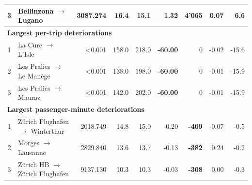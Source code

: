 \documentclass[preprint,12pt]{elsarticle}
\begin{document}
\begin{table}[htbp]
{\begin{tabular}{clrrrrrrr}
3 & Bellinzona $\rightarrow$ Lugano & 3087.274 & 16.4 & 15.1 & 1.32 & \textbf{4'065} & 0.07 & 6.6 \\
\midrule
\multicolumn{9}{l}{\textbf{Largest per-trip deteriorations}} \\
\midrule
1 & La Cure $\rightarrow$ L'Isle & <0.001 & 158.0 & 218.0 & \textbf{-60.00} & 0 & -0.02 & -15.6 \\
2 & Les Pralies $\rightarrow$ Le Manège & <0.001 & 138.0 & 198.0 & \textbf{-60.00} & 0 & -0.01 & -15.9 \\
3 & Les Pralies $\rightarrow$ Mauraz & <0.001 & 142.0 & 202.0 & \textbf{-60.00} & 0 & -0.01 & -15.9 \\
\midrule
\multicolumn{9}{l}{\textbf{Largest passenger-minute deteriorations}} \\
\midrule
1 & Zürich Flughafen $\rightarrow$ Winterthur & 2018.749 & 14.8 & 15.0 & -0.20 & \textbf{-409} & -0.07 & -0.5 \\
2 & Morges $\rightarrow$ Lausanne & 2829.840 & 13.6 & 13.7 & -0.13 & \textbf{-382} & 0.24 & -0.2 \\
3 & Zürich HB $\rightarrow$ Zürich Flughafen & 9137.130 & 10.3 & 10.3 & -0.03 & \textbf{-308} & 0.00 & -0.3 \\
\bottomrule
\end{tabular}%
}
\end{table}
\end{document}
